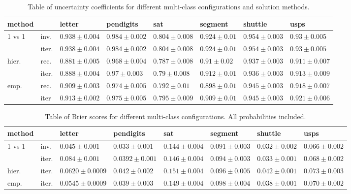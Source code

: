 \begin{table}
	\caption{Table of uncertainty coefficients for different multi-class
	configurations and solution methods.}
{\small
\begin{tabular}{|ll|llllll|}
\hline
 method & & letter & pendigits & sat & segment & shuttle & usps\\
\hline\hline
1 vs 1 & inv. & $0.938 \pm 0.004 $ & $0.984 \pm 0.002 $ & $0.804 \pm 0.008 $ & $0.924 \pm 0.01 $ & $0.954 \pm 0.003 $ & $0.93 \pm 0.005 $ \\
& iter. & $0.938 \pm 0.004 $ & $0.984 \pm 0.002 $ & $0.804 \pm 0.008 $ & $0.924 \pm 0.01 $ & $0.954 \pm 0.003 $ & $0.93 \pm 0.005 $ \\
hier. & rec. & $0.881 \pm 0.005 $ & $0.968 \pm 0.004 $ & $0.787 \pm 0.008 $ & $0.91 \pm 0.02 $ & $0.937 \pm 0.003 $ & $0.911 \pm 0.007 $ \\
 & iter. & $0.888 \pm 0.004 $ & $0.97 \pm 0.003 $ & $0.79 \pm 0.008 $ & $0.912 \pm 0.01 $ & $0.936 \pm 0.003 $ & $0.913 \pm 0.009 $ \\
emp. & rec. & $0.909 \pm 0.003 $ & $0.974 \pm 0.005 $ & $0.792 \pm 0.01 $ & $0.898 \pm 0.01 $ & $0.945 \pm 0.003 $ & $0.918 \pm 0.007 $ \\
 & iter & $0.913 \pm 0.002 $ & $0.975 \pm 0.005 $ & $0.795 \pm 0.009 $ & $0.909 \pm 0.01 $ & $0.945 \pm 0.003 $ & $0.921 \pm 0.006 $ \\
\hline
\end{tabular}
}
\end{table}

\begin{table}
	\caption{Table of Brier scores for different multi-class configurations. All probabilities included.}
{\small
\begin{tabular}{|ll|llllll|}
\hline
 method & & letter & pendigits & sat & segment & shuttle & usps\\
\hline\hline
1 vs 1 & inv. & $0.045 \pm 0.001 $ & $0.033 \pm 0.001 $ & $0.144 \pm 0.004 $ & $0.091 \pm 0.003 $ & $0.032 \pm 0.002 $ & $0.066 \pm 0.002 $ \\
 & iter. & $0.084 \pm 0.001 $ & $0.0392 \pm 0.001 $ & $0.146 \pm 0.004 $ & $0.094 \pm 0.003 $ & $0.033 \pm 0.001 $ & $0.068 \pm 0.002 $ \\
hier. & iter. & $0.0620 \pm 0.0009 $ & $0.042 \pm 0.002 $ & $0.151 \pm 0.004 $ & $0.096 \pm 0.005 $ & $0.042 \pm 0.001 $ & $0.073 \pm 0.003 $ \\
emp. & iter. & $0.0545 \pm 0.0009 $ & $0.039 \pm 0.003 $ & $0.149 \pm 0.004 $ & $0.098 \pm 0.004 $ & $0.038 \pm 0.001 $ & $0.070 \pm 0.002 $ \\
\hline
\end{tabular}
}
\end{table}

